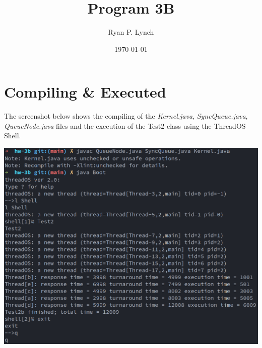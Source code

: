 \documentclass[a4paper,11pt,twoside]{article}
\author{Ryan P. Lynch}
\date{\today}
\title{Program 3B}
\begin{document}
\maketitle
\section*{Compiling \& Executed}
\label{sec:org427e9d9}
The screenshot below shows the compiling of the \emph{Kernel.java}, \emph{SyncQueue.java}, \emph{QueueNode.java} files and the execution of the Test2 class using the ThreadOS Shell.
\begin{center}
\includegraphics[width=.9\linewidth]{./Compile&Execution.png}
\end{center}
\end{document}

